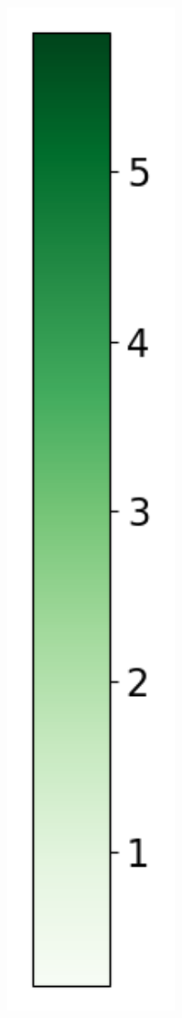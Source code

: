 \begin{figure}
\begin{subfigure}[b]{0.075\textwidth}
        \includegraphics[width=1\textwidth]{Results/kd-laplace/kd-Laplace/circle-dataset/heatmap_legend_distance.png}
    \end{subfigure}
\end{figure}
\newpage
